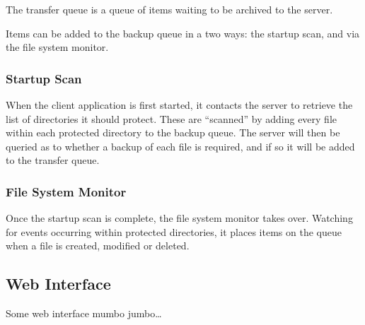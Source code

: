The transfer queue is a queue of items waiting to be archived to the server.

Items can be added to the backup queue in a two ways: the startup scan, and via
the file system monitor.

\subsubsection{Startup Scan}

When the client application is first started, it contacts the server to
retrieve the list of directories it should protect. These are ``scanned'' by
adding every file within each protected directory to the backup queue. The
server will then be queried as to whether a backup of each file is required,
and if so it will be added to the transfer queue.

\subsubsection{File System Monitor}

Once the startup scan is complete, the file system monitor takes over. Watching
for events occurring within protected directories, it places items on the queue
when a file is created, modified or deleted.

\subsection{Web Interface}

Some web interface mumbo jumbo\ldots
